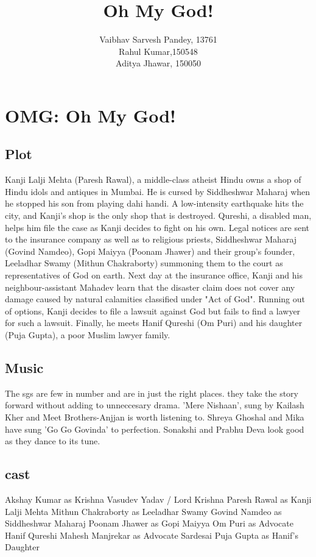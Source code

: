 \documentclass[a4paper]{article}
\title{Oh My God! }
\author{Vaibhav Sarvesh Pandey, 13761\\

	Rahul Kumar,150548\\
	Aditya Jhawar, 150050}
\begin{document}
	\maketitle
	

\section{OMG: Oh My God! }
\subsection{Plot}
Kanji Lalji Mehta (Paresh Rawal), a middle-class atheist Hindu owns a shop of Hindu idols and antiques in Mumbai. He is cursed by Siddheshwar Maharaj when he stopped his son from playing dahi handi. A low-intensity earthquake hits the city, and Kanji's shop is the only shop that is destroyed. Qureshi, a disabled man, helps him file the case as Kanji decides to fight on his own. Legal notices are sent to the insurance company as well as to religious priests, Siddheshwar Maharaj (Govind Namdeo), Gopi Maiyya (Poonam Jhawer) and their group's founder, Leeladhar Swamy (Mithun Chakraborty) summoning them to the court as representatives of God on earth.
Next day at the insurance office, Kanji and his neighbour-assistant Mahadev learn that the disaster claim does not cover any damage caused by natural calamities classified under "Act of God".   Running out of options, Kanji decides to file a lawsuit against God but fails to find a lawyer for such a lawsuit. Finally, he meets Hanif Qureshi (Om Puri) and his daughter (Puja Gupta), a poor Muslim lawyer family.
	\subsection{Music }
The sgs are few in number and are in just the right places. they take the story forward without adding to unneccesary drama. 'Mere Nishaan', sung by Kailash Kher and Meet Brothers-Anjjan is worth listening to. Shreya Ghoshal and Mika have sung 'Go Go Govinda' to perfection. Sonakshi and Prabhu Deva look good as they dance to its tune. 
	        
	  \subsection{cast}
	        
Akshay Kumar as Krishna Vasudev Yadav / Lord Krishna
Paresh Rawal as Kanji Lalji Mehta
Mithun Chakraborty as Leeladhar Swamy
Govind Namdeo as Siddheshwar Maharaj
Poonam Jhawer as Gopi Maiyya
Om Puri as Advocate Hanif Qureshi
Mahesh Manjrekar as Advocate Sardesai
Puja Gupta as Hanif's Daughter                  
	  
\end{document}
